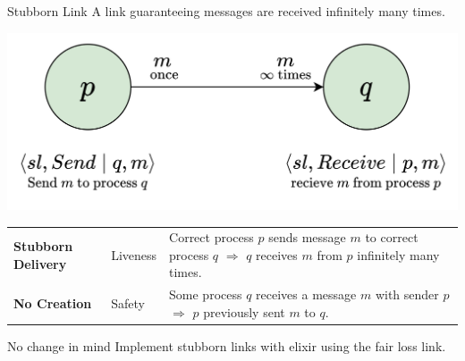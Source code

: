 \begin{definitionbox}{Stubborn Link}
    A link guaranteeing messages are received infinitely many times.
    \begin{center}
        \includegraphics[width=.6\textwidth]{broadcast/images/stubborn_links.drawio.png}
    \end{center}
    \begin{center}
        \begin{tabular}{l l p{}}
            \textbf{Stubborn Delivery} & Liveness & Correct process $p$ sends message $m$ to correct process $q$ $\Rightarrow$ $q$ receives $m$ from $p$ infinitely many times. \\
            \textbf{No Creation} & Safety & Some process $q$ receives a message $m$ with sender $p$ $\Rightarrow$ $p$ previously sent $m$ to $q$. \\
        \end{tabular}
    \end{center}
\end{definitionbox}

\begin{examplebox}{No change in mind}
    Implement stubborn links with elixir using the fair loss link.
    \tcblower
    \unfinished
\end{examplebox}

